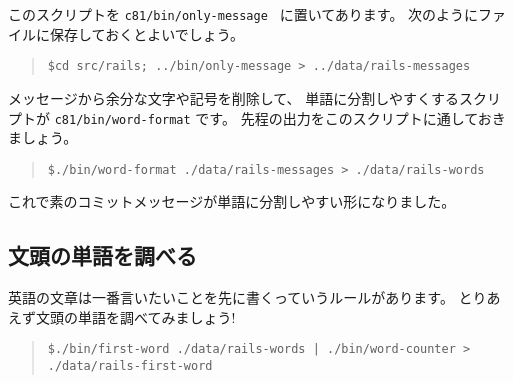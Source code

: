 \documentclass{jarticle}
\begin{document}
このスクリプトを {\tt c81/bin/only-message } に置いてあります。
次のようにファイルに保存しておくとよいでしょう。
\begin{quote}
{\tt \$cd src/rails; ../bin/only-message > ../data/rails-messages }
\end{quote}

メッセージから余分な文字や記号を削除して、
単語に分割しやすくするスクリプトが {\tt c81/bin/word-format} です。
先程の出力をこのスクリプトに通しておきましょう。
\begin{quote}
{\tt \$./bin/word-format ./data/rails-messages > ./data/rails-words }
\end{quote}

これで素のコミットメッセージが単語に分割しやすい形になりました。


\subsection{文頭の単語を調べる}
英語の文章は一番言いたいことを先に書くっていうルールがあります。
とりあえず文頭の単語を調べてみましょう!
\begin{quote}
{\tt \$./bin/first-word ./data/rails-words | ./bin/word-counter > ./data/rails-first-word}
\end{quote}
\end{document}
